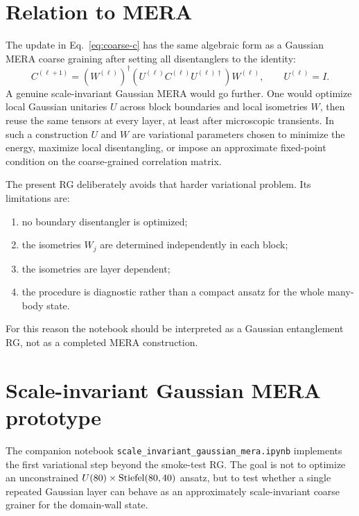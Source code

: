 \documentclass[aps,prb,twocolumn,floatfix]{revtex4-2}
\begin{document}
\section{Relation to MERA}

The update in Eq.~\eqref{eq:coarse-c} has the same algebraic form as a Gaussian
MERA coarse graining after setting all disentanglers to the identity:
\begin{equation}
  C^{(\ell+1)}
  =
  \left(W^{(\ell)}\right)^\dagger
  \left(U^{(\ell)} C^{(\ell)} U^{(\ell)\dagger}\right)
  W^{(\ell)},
  \qquad
  U^{(\ell)}=I.
  \label{eq:mera-with-u}
\end{equation}
A genuine scale-invariant Gaussian MERA would go further.  One would optimize
local Gaussian unitaries \(U\) across block boundaries and local isometries
\(W\), then reuse the same tensors at every layer, at least after microscopic
transients.  In such a construction \(U\) and \(W\) are variational parameters
chosen to minimize the energy, maximize local disentangling, or impose an
approximate fixed-point condition on the coarse-grained correlation matrix.

The present RG deliberately avoids that harder variational problem.  Its
limitations are:
\begin{enumerate}
\item no boundary disentangler is optimized;
\item the isometries \(W_j\) are determined independently in each block;
\item the isometries are layer dependent;
\item the procedure is diagnostic rather than a compact ansatz for the whole
      many-body state.
\end{enumerate}
For this reason the notebook should be interpreted as a Gaussian entanglement
RG, not as a completed MERA construction.

\section{Scale-invariant Gaussian MERA prototype}

The companion notebook \texttt{scale\_invariant\_gaussian\_mera.ipynb}
implements the first variational step beyond the smoke-test RG.  The goal is
not to optimize an unconstrained \(U(80)\times{\rm Stiefel}(80,40)\) ansatz,
but to test whether a single repeated Gaussian layer can behave as an
approximately scale-invariant coarse grainer for the domain-wall state.
\end{document}

